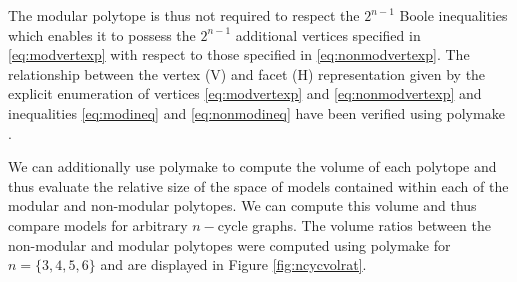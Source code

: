 The modular polytope is thus not required to respect the $2^{n-1}$ Boole inequalities which enables it to possess the $2^{n-1}$ additional vertices specified in \ref{eq:modvertexp} with respect to those specified in \ref{eq:nonmodvertexp}. The relationship between the vertex (V) and facet (H) representation given by the explicit enumeration of vertices \ref{eq:modvertexp} and \ref{eq:nonmodvertexp} and inequalities \ref{eq:modineq} and \ref{eq:nonmodineq} have been verified using polymake \cite{GawrilowEwgenijD-TJoswig2000}.

We can additionally use polymake to compute the volume of each polytope and thus evaluate the relative size of the space of models contained within each of the modular and non-modular polytopes. We can compute this volume and thus compare models for arbitrary $n-$cycle graphs. The volume ratios between the non-modular and modular polytopes were computed using polymake for $n=\{3,4,5,6\}$ and are displayed in Figure \ref{fig:ncycvolrat}.
